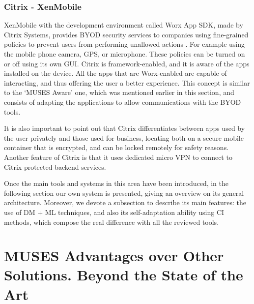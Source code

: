 \subsubsection{Citrix - XenMobile}

XenMobile with the development environment called Worx App SDK, made by Citrix Systems, provides BYOD security services to companies using fine-grained policies to prevent users from performing unallowed actions \cite{WorxSDK}. For example using the mobile phone camera, GPS, or microphone. These policies can be turned on or off using its own GUI. Citrix is framework-enabled, and it is aware of the apps installed on the device. All the apps that are Worx-enabled are capable of interacting, and thus offering the user a better experience. This concept is similar to the `MUSES Aware' one, which was mentioned earlier in this section, and consists of adapting the applications to allow communications with the BYOD tools.

It is also important to point out that Citrix differentiates between apps used by the user privately and those used for business, locating both on a secure mobile container that is encrypted, and can be locked remotely for safety reasons. Another feature of Citrix is that it uses dedicated micro VPN to connect to Citrix-protected backend services.

Once the main tools and systems in this area have been introduced, in the following section our own system is presented, giving an overview on its general architecture. Moreover, we devote a subsection to describe its main features: the use of DM + ML techniques, and also its self-adaptation ability using CI methods, which compose the real difference with all the reviewed tools. 

\section{MUSES Advantages over Other Solutions. Beyond the State of the Art}
\label{sec:comparison}

